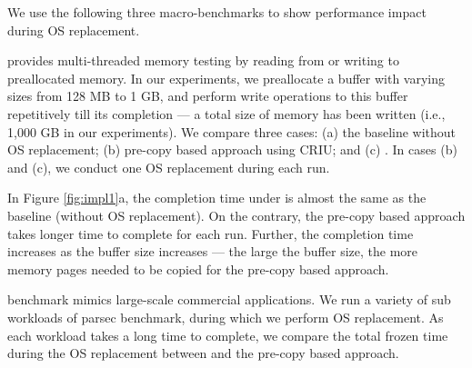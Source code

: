 We use the following three macro-benchmarks to show performance impact during OS replacement.

 \cite{sysbench} provides multi-threaded memory testing by reading from or writing to preallocated memory. In our experiments, we preallocate a buffer with varying sizes from 128 MB to 1 GB, and perform write operations to this buffer repetitively till its completion --- a total size of memory has been written (i.e., 1,000 GB in our experiments). We compare three cases: (a) the baseline without OS replacement; (b) pre-copy based approach using CRIU; and (c) \arch. In cases (b) and (c), we conduct one OS replacement during each run.


In Figure \ref{fig:impl1}a, the completion time under \arch is almost the same as the baseline (without OS replacement). On the contrary, the pre-copy based approach takes longer time to complete for each run. Further, the completion time increases as the buffer size increases --- the large the buffer size, the more memory pages needed to be copied for the pre-copy based approach. 

 \cite{parsec} benchmark mimics large-scale commercial applications. We run a variety of sub workloads of parsec benchmark, during which we perform OS replacement. As each workload takes a long time to complete, we compare the total frozen time during the OS replacement between \arch and the pre-copy based approach.


